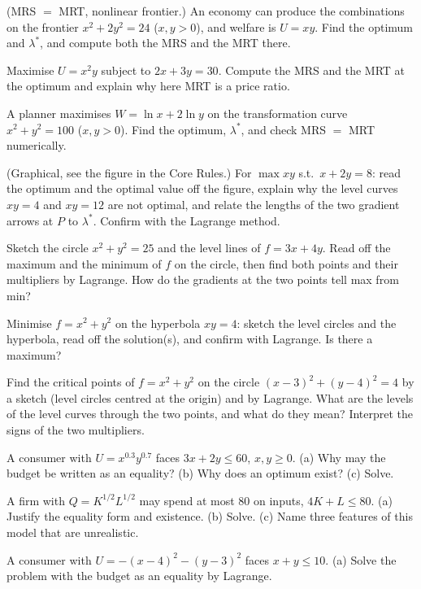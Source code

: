 \begin{problems}
  \item (MRS $=$ MRT, nonlinear frontier.) An economy can produce the
        combinations on the frontier $x^{2}+2y^{2}=24$ ($x,y>0$), and
        welfare is $U=xy$. Find the optimum and $\lambda^*$, and compute
        both the MRS and the MRT there.
  \item Maximise $U=x^{2}y$ subject to $2x+3y=30$. Compute the MRS and the
        MRT at the optimum and explain why here MRT is a price ratio.
  \item A planner maximises $W=\ln x+2\ln y$ on the transformation curve
        $x^{2}+y^{2}=100$ ($x,y>0$). Find the optimum, $\lambda^*$, and
        check MRS $=$ MRT numerically.
  \item (Graphical, see the figure in the Core Rules.) For
        $\max xy$ s.t.\ $x+2y=8$: read the optimum and the optimal value off
        the figure, explain why the level curves $xy=4$ and $xy=12$ are not
        optimal, and relate the lengths of the two gradient arrows at $P$
        to $\lambda^*$. Confirm with the Lagrange method.
  \item Sketch the circle $x^{2}+y^{2}=25$ and the level lines of
        $f=3x+4y$. Read off the maximum and the minimum of $f$ on the
        circle, then find both points and their multipliers by Lagrange.
        How do the gradients at the two points tell max from min?
  \item Minimise $f=x^{2}+y^{2}$ on the hyperbola $xy=4$: sketch the level
        circles and the hyperbola, read off the solution(s), and confirm
        with Lagrange. Is there a maximum?
  \item Find the critical points of $f=x^{2}+y^{2}$ on the circle
        $(x-3)^{2}+(y-4)^{2}=4$ by a sketch (level circles centred at the
        origin) and by Lagrange. What are the levels of the level curves
        through the two points, and what do they mean? Interpret the signs
        of the two multipliers.
  \item A consumer with $U=x^{0.3}y^{0.7}$ faces $3x+2y\le60$,
        $x,y\ge0$. (a) Why may the budget be written as an equality?
        (b) Why does an optimum exist? (c) Solve.
  \item A firm with $Q=K^{1/2}L^{1/2}$ may spend at most $80$ on inputs,
        $4K+L\le80$. (a) Justify the equality form and existence.
        (b) Solve. (c) Name three features of this model that are
        unrealistic.
  \item A consumer with $U=-(x-4)^{2}-(y-3)^{2}$ faces $x+y\le10$.
        (a) Solve the problem with the budget as an equality by Lagrange.

\end{problems}
